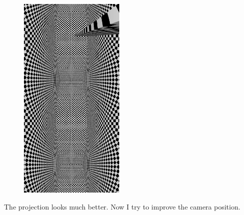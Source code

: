 \documentclass[12pt, a4paper]{article}
\begin{document}
\begin{center}
\begin{figure}[H]
\centering
\includegraphics[height=10cm]{./XL-51_4.png}\\
\end{figure}
\end{center}

The projection looks much better. Now I try to improve the camera position.\\

\begin{scriptsize}
\begin{ttfamily}

\end{ttfamily}
\end{scriptsize}
\end{document}
